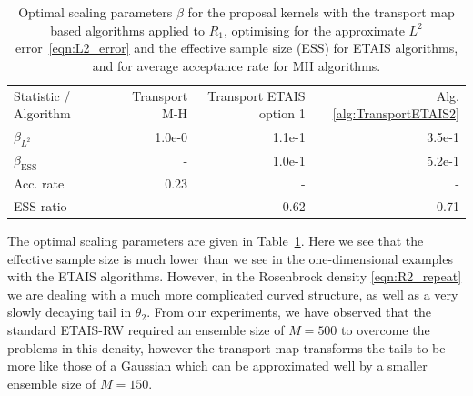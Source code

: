 \documentclass[final]{siamltex}
\newcommand{\edit}[1]{{\color{red} #1}}
\begin{document}
\begin{table}[!ht]
\centering
\begin{tabular}{lrrr}
\toprule
	Statistic \quad / \quad Algorithm & Transport M-H &
                                                           Transport
                                                            ETAIS
                                                            option 1 & Alg. \ref{alg:TransportETAIS2}  \\ \cmidrule(lr){1-4}
	\edit{$\beta_{L^2}$}				 & 1.0e-0 & 1.1e-1 & 3.5e-1 \\
	\edit{$\beta_{\text{ESS}}$}				 & - & 1.0e-1 & 5.2e-1 \\ \cmidrule(lr){1-4}
	Acc. rate							 & 0.23 & - & - \\
	ESS ratio							 & - & 0.62 & 0.71 \\
\bottomrule
\end{tabular}
\caption{\edit{Optimal scaling parameters $\beta$ for the proposal
    kernels with the transport map based
  algorithms applied to $R_1$, optimising for the approximate
    $L^2$ error~\eqref{eqn:L2_error} and
  the effective sample size (ESS) for ETAIS algorithms, and for average
  acceptance rate for MH algorithms.}}
\label{tab:R2_opt_scaling}
\end{table}

The optimal scaling parameters are given in
Table~\ref{tab:R2_opt_scaling}. Here we see that the effective sample
size is much lower than we see in the one-dimensional examples with
the ETAIS algorithms. However, in the Rosenbrock density
\eqref{eqn:R2_repeat} we are dealing with a much more complicated
curved structure, as well as a very slowly decaying tail in
$\theta_2$. From our experiments, we have observed that the standard ETAIS-RW required an ensemble size of $M=500$ to overcome the problems in this density, however the transport map transforms the tails to be more like those of a Gaussian which can be approximated well by a smaller ensemble size of $M=150$.
\end{document}
